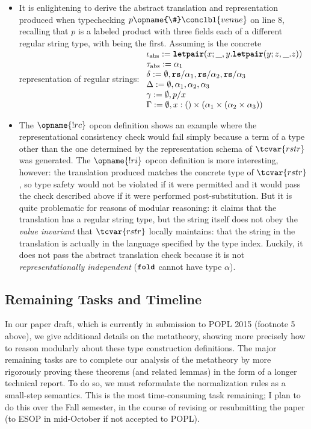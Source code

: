 \begin{itemize}
\item It is enlightening to derive the abstract translation and representation produced when typechecking $p\opname{\#}\conclbl{venue}$ on line 8, recalling that $p$ is a labeled product with three fields each of a different regular string type, with  being the first. Assuming  is the concrete representation of regular strings: $\begin{array}{l}
\iota_\text{abs} := \texttt{\textbf{letpair}}(x; \_, y.\texttt{\textbf{letpair}}(y; z, \_.z))\\
\tau_\text{abs} := \alpha_1\\
\delta := \emptyset, \texttt{\textbf{rs}}/\alpha_1, \texttt{\textbf{rs}}/\alpha_2, \texttt{\textbf{rs}}/\alpha_3\\
\Delta := \emptyset, \alpha_1, \alpha_2, \alpha_3\\
\gamma := \emptyset, p/x\\
\Gamma := \emptyset, x : () \times (\alpha_1 \times (\alpha_2 \times \alpha_3))
\end{array}$
\item The $\opname{!rc}$ opcon definition shows an example where the representational consistency check would fail simply because a term of a type other than the one determined by the representation schema of $\tcvar{rstr}$ was generated. The $\opname{!ri}$ opcon definition is more interesting, however: the translation produced matches the concrete type of $\tcvar{rstr}$, so type safety would not be violated if it were permitted and it would pass the check described above if it were performed post-substitution. But it is quite problematic for reasons of modular reasoning: it claims that the translation has a regular string type, but the string itself does not obey the \emph{value invariant} that $\tcvar{rstr}$ locally maintains: that the string in the translation is actually in the language specified by the type index. Luckily, it does not pass the abstract translation check because it is not \emph{representationally independent} ($\texttt{\textbf{fold}}$ cannot have type $\alpha$).
\end{itemize}

\subsection{Remaining Tasks and Timeline}
In our paper draft, which is currently in submission to POPL 2015 (footnote 5 above), we give  additional details on the metatheory, showing more precisely how to reason modularly about these type construction definitions. The major remaining tasks are to complete our analysis of the metatheory by more rigorously proving these theorems (and related lemmas) in the form of a longer technical report. To do so, we must reformulate the normalization rules as a small-step semantics. This is the most time-consuming task remaining; I plan to do this over the Fall semester, in the course of revising or resubmitting the paper (to ESOP in mid-October if not accepted to POPL).

